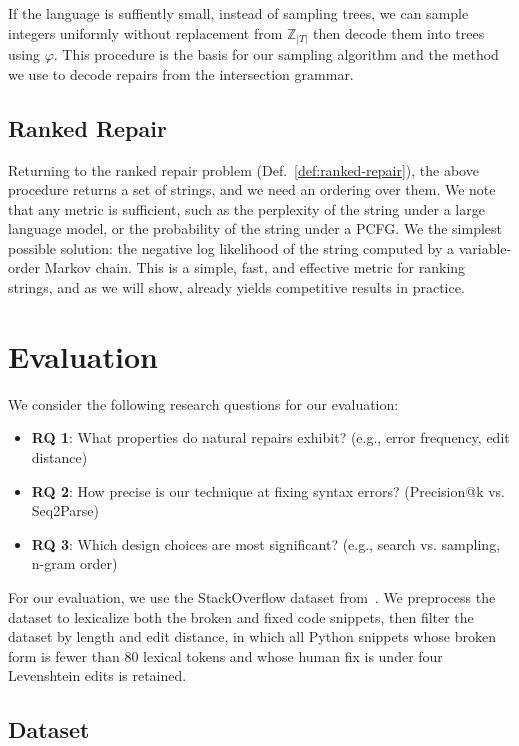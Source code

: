 \documentclass[sigplan,review,anonymous,acmsmall]{acmart}\settopmatter{printfolios=false,printccs=false,printacmref=false}
\begin{document}
If the language is suffiently small, instead of sampling trees, we can sample integers uniformly without replacement from $\mathbb{Z}_{|T|}$ then decode them into trees using $\varphi$. This procedure is the basis for our sampling algorithm and the method we use to decode repairs from the intersection grammar.

  \subsection{Ranked Repair}

  Returning to the ranked repair problem (Def.~\ref{def:ranked-repair}), the above procedure returns a set of strings, and we need an ordering over them. We note that any metric is sufficient, such as the perplexity of the string under a large language model, or the probability of the string under a PCFG. We the simplest possible solution: the negative log likelihood of the string computed by a variable-order Markov chain. This is a simple, fast, and effective metric for ranking strings, and as we will show, already yields competitive results in practice.

  \section{Evaluation}

  We consider the following research questions for our evaluation:

  \begin{itemize}
    \item \textbf{RQ 1}: What properties do natural repairs exhibit? (e.g., error frequency, edit distance)
    \item \textbf{RQ 2}: How precise is our technique at fixing syntax errors? (Precision@k vs. Seq2Parse)
    \item \textbf{RQ 3}: Which design choices are most significant? (e.g., search vs. sampling, n-gram order)
  \end{itemize}

  For our evaluation, we use the StackOverflow dataset from~\cite{hindle2012naturalness}. We preprocess the dataset to lexicalize both the broken and fixed code snippets, then filter the dataset by length and edit distance, in which all Python snippets whose broken form is fewer than 80 lexical tokens and whose human fix is under four Levenshtein edits is retained.

  \subsection{Dataset}
\end{document}
